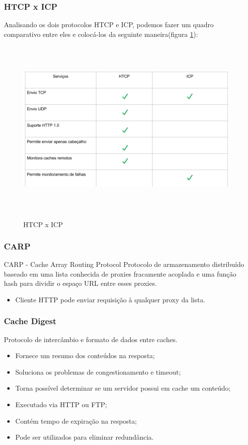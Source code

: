 \subsubsection{HTCP x ICP}
Analisando os dois protocolos HTCP e ICP, podemos fazer um quadro comparativo entre eles e coloc\'a-los da seguinte maneira(figura \ref{figura:htcp_x_icp}):

\begin{figure}[H]
\caption{HTCP x ICP}
\includegraphics[height=9cm]{Figuras/htcp_x_icp.png} 
\label{figura:htcp_x_icp}
\end{figure}

\subsubsection{CARP}
\label{section:CARP}
CARP -  Cache Array Routing Protocol
\newline Protocolo de armazenamento distribu\'ido baseado em uma lista conhecida de proxies fracamente acoplada e uma fun\c{c}\~ao hash para dividir o espa\c{c}o URL entre esses proxies.
\begin{itemize}
\item Cliente HTTP pode enviar requisi\c{c}\~ao \`a qualquer proxy da lista.
\end{itemize}

\subsubsection{Cache Digest}
\label{section:Cache Digest}
Protocolo de interc\^ambio e formato de dados entre caches.
\begin{itemize}
\item Fornece um resumo dos conte\'udos na resposta;
\item Soluciona os problemas de congestionamento e timeout;
\item Torna poss\'ivel determinar se um servidor possui em cache um conte\'udo;
\item Executado via HTTP ou FTP;
\item Cont\'em tempo de expira\c{c}\~ao na resposta;
\item Pode ser utilizados para eliminar redund\^ancia.
\end{itemize}
